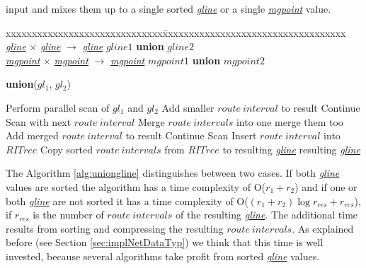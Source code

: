\documentclass[a4paper]{article}
\newcommand{\op}[1]{\textbf{#1}}
\newcommand{\dt}[1]{\textsl{\underline{#1}}}
\begin{document}
input and mixes them up to a single sorted \dt{gline} or a single \dt{mgpoint}
value.
\begin{tabbing}
xxxxxxxxxxxxxxxxxxxxxxxxxxxxxx\=xxxxxxxxxxxxxxxxxxxxxxxxxxxxxxxxxxx\kill
\dt{gline} $\times$ \dt{gline} $\rightarrow$ \dt{gline} \> $gline1$ \op{union} $gline2$ \\
\dt{mgpoint} $\times$ \dt{mgpoint} $\rightarrow$ \dt{mgpoint} \> $mgpoint1$ \op{union} $mgpoint2$\\
\end{tabbing}
\begin{algorithm}[H]
  \caption{\op{union}($gl_1$, $gl_2$)}
  \label{alg:uniongline}
  \begin{algorithmic}
      \STATE Perform parallel scan of $gl_1$ and $gl_2$
         \STATE Add smaller $route\ interval$ to result
         \STATE Continue Scan with next $route\ interval$
      \ELSE
          \STATE Merge $route\ intervals$ into one
            \STATE merge them too
          \ENDIF
          \STATE Add merged $route\ interval$ to result
          \STATE Continue Scan
      \ENDIF
    \ELSE
        \STATE Insert $route\ interval$ into $RITree$
      \ENDFOR
      \STATE Copy sorted $route\ intervals$ from $RITree$ to resulting \dt{gline}
    \ENDIF
    \RETURN resulting \dt{gline}
  \end{algorithmic}
\end{algorithm}
The Algorithm \ref{alg:uniongline} distinguishes between two cases.
If both \dt{gline} values are sorted the algorithm has a time complexity of
O($r_1 + r_2$) and if one or both \dt{gline} are not sorted it has a time
complexity of O($(r_1 + r_2) \log r_{res} + r_{res}$), if $r_{res}$ is the
number of $route\ intervals$ of the resulting \dt{gline}. The additional
time results from sorting and compressing the resulting $route\ intervals$. As
explained before (see Section \ref{sec:implNetDataTyp}) we think that this time
is well invested, because several algorithms take profit from sorted \dt{gline}
values.
\end{document}
